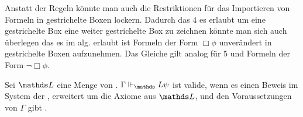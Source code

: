 
Anstatt der Regeln könnte man auch die Restriktionen für das Importieren von Formeln in gestrichelte Boxen lockern.
Dadurch das $4$ es erlaubt um eine gestrichelte Box eine weiter gestrichelte Box zu zeichnen könnte man sich auch überlegen das es im alg. erlaubt ist Formeln der Form $\Box \phi$ unverändert in gestrichelte Boxen aufzunehmen.
Das Gleiche gilt analog für $5$ und Formeln der Form $\neg \Box \phi$.

\begin{definition}
	Sei $\Menge{L}$ eine Menge von \formelSchemata. 
	$\Gamma
	\Vdash_\Menge{L} \psi$ ist valide, wenn es einen Beweis im 
	\ND System der 
	\NML, erweitert um die Axiome aus 
	$\Menge{L}$, und den Voraussetzungen von 
	$\Gamma$ gibt \cite[S.330]{huth2004logic}.
\end{definition}




